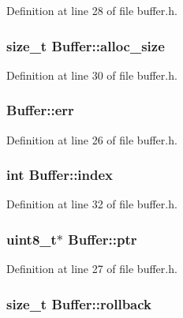 Definition at line 28 of file buffer.\+h.

\hypertarget{struct_buffer_a96fe3160d9fc953e060a14b6c2ad52bd}{}
\subsubsection[{alloc\+\_\+size}]{\setlength{\rightskip}{0pt plus 5cm}size\+\_\+t Buffer\+::alloc\+\_\+size}\label{struct_buffer_a96fe3160d9fc953e060a14b6c2ad52bd}


Definition at line 30 of file buffer.\+h.

\hypertarget{struct_buffer_a879aecdae33529cd7b68da64db41e5af}{}
\subsubsection[{err}]{ Buffer\+::err}\label{struct_buffer_a879aecdae33529cd7b68da64db41e5af}


Definition at line 26 of file buffer.\+h.

\hypertarget{struct_buffer_abb6fa5333fd31327f6c5cb2e56e4a5ae}{}
\subsubsection[{index}]{\setlength{\rightskip}{0pt plus 5cm}int Buffer\+::index}\label{struct_buffer_abb6fa5333fd31327f6c5cb2e56e4a5ae}


Definition at line 32 of file buffer.\+h.

\hypertarget{struct_buffer_a31a306e12a70a812149b2eaf22279ea5}{}
\subsubsection[{ptr}]{\setlength{\rightskip}{0pt plus 5cm}uint8\+\_\+t$\ast$ Buffer\+::ptr}\label{struct_buffer_a31a306e12a70a812149b2eaf22279ea5}


Definition at line 27 of file buffer.\+h.

\hypertarget{struct_buffer_a056d3a336c67135e9c516bc6bd20e6b7}{}
\subsubsection[{rollback}]{\setlength{\rightskip}{0pt plus 5cm}size\+\_\+t Buffer\+::rollback}\label{struct_buffer_a056d3a336c67135e9c516bc6bd20e6b7}


